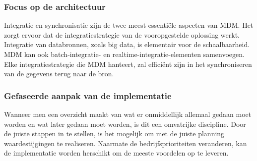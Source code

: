 
\subsubsection{Focus op de architectuur}
Integratie en synchronisatie zijn de twee meest essentiële aspecten van MDM. Het zorgt ervoor dat de integratiestrategie van de vooropgestelde oplossing werkt. Integratie van databronnen, zoals big data, is elementair voor de schaalbaarheid. MDM kan ook batch-integratie- en realtime-integratie-elementen samenvoegen. Elke integratiestrategie die MDM hanteert, zal efficiënt zijn in het synchroniseren van de gegevens terug naar de bron.


\subsubsection{Gefaseerde aanpak van de implementatie}
Wanneer men een overzicht maakt van wat er onmiddellijk allemaal gedaan moet worden en wat later gedaan moet worden, is dit een omvatrijke discipline. Door de juiste stappen in te stellen, is het mogelijk om met de juiste planning waardestijgingen te realiseren. Naarmate de bedrijfsprioriteiten veranderen, kan de implementatie worden herschikt om de meeste voordelen op te leveren.

